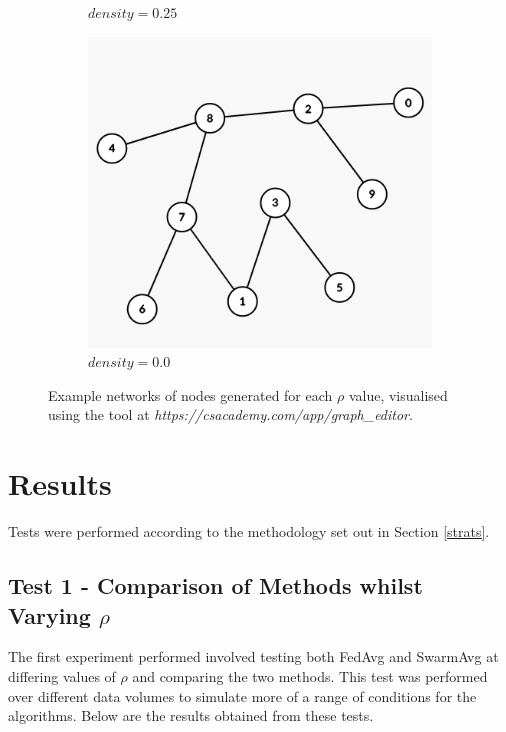 \documentclass[letterpaper, 10 pt, conference]{ieeeconf}  %
\begin{document}
\begin{figure}[H]
\begin{subfigure}[b]{0.15\textwidth}
		\caption{$density=0.25$}
	\end{subfigure}
	\begin{subfigure}[b]{0.15\textwidth}
		\centering
		\includegraphics[width=\textwidth]{sparsegraph0}
		\caption{$density=0.0$}
	\end{subfigure}
	\caption{Example networks of nodes generated for each $\rho$ value, visualised using the tool at \emph{https://csacademy.com/app/graph\_editor}. \label{densefig}}
{}\end{figure}

\section{Results}
Tests were performed according to the methodology set out in Section \ref{strats}.

\subsection{Test 1 - Comparison of Methods whilst Varying $\rho$}
The first experiment performed involved testing both FedAvg and SwarmAvg at differing values of $\rho$ and comparing the two methods. This test was performed over different data volumes to simulate more of a range of conditions for the algorithms. Below are the results obtained from these tests.
\end{document}
